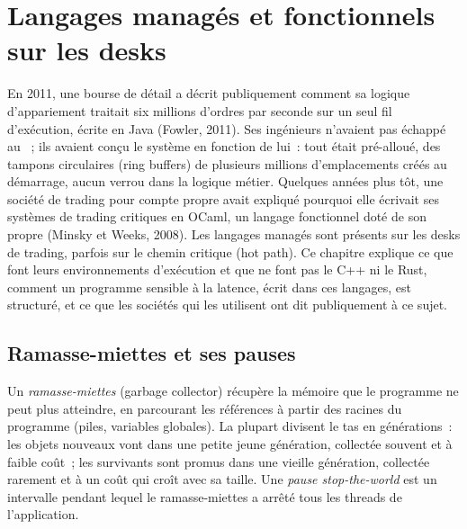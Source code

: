 \chapter{Langages managés et fonctionnels sur les desks}\label{ch:ll:managed-and-functional-languages-on-the-desk}

En 2011, une bourse de détail a décrit publiquement comment sa logique d'appariement traitait six millions d'ordres par seconde sur un seul
fil d'exécution, écrite en Java (Fowler, 2011). Ses ingénieurs n'avaient pas échappé au ~; ils avaient conçu le système en fonction de lui~:
tout était pré-alloué, des tampons circulaires (ring buffers) de plusieurs millions d'emplacements créés au démarrage, aucun verrou dans la logique métier. Quelques
années plus tôt, une société de trading pour compte propre avait expliqué pourquoi elle écrivait ses systèmes de trading critiques en OCaml, un langage fonctionnel
doté de son propre  (Minsky et Weeks, 2008). Les langages managés sont présents sur les desks de trading, parfois sur
le chemin critique (hot path). Ce chapitre explique ce que font leurs environnements d'exécution et que ne font pas le C++ ni le Rust, comment un programme
sensible à la latence, écrit dans ces langages, est structuré, et ce que les sociétés qui les utilisent ont dit publiquement à ce sujet.

\section{Ramasse-miettes et ses pauses}

\begin{definition}\label{def:ll:managed-and-functional-languages-on-the-desk:gc}
Un \emph{ramasse-miettes} (garbage collector) récupère la mémoire que le programme ne peut plus atteindre, en parcourant
les références à partir des racines du programme (piles, variables globales). La plupart divisent le tas en générations~: les objets nouveaux vont dans une petite jeune génération,
collectée souvent et à faible coût~; les survivants sont promus dans une vieille génération, collectée rarement et à un coût qui croît
avec sa taille. Une \emph{pause stop-the-world} est un intervalle pendant lequel le ramasse-miettes
a arrêté tous les threads de l'application.
\end{definition}

